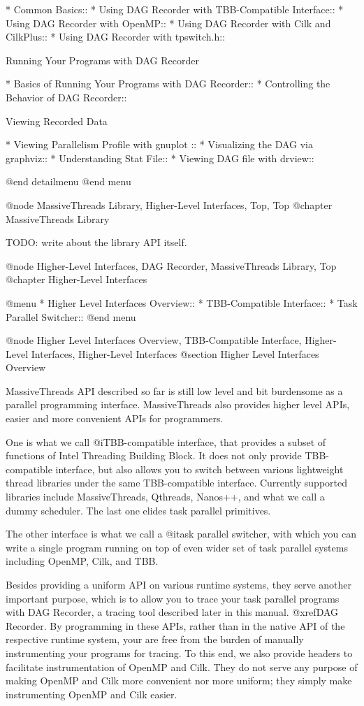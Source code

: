 * Common Basics::
* Using DAG Recorder with TBB-Compatible Interface::
* Using DAG Recorder with OpenMP::
* Using DAG Recorder with Cilk and CilkPlus::
* Using DAG Recorder with tpswitch.h::

Running Your Programs with DAG Recorder

* Basics of Running Your Programs with DAG Recorder::
* Controlling the Behavior of DAG Recorder::

Viewing Recorded Data

* Viewing Parallelism Profile with gnuplot ::
* Visualizing the DAG via graphviz::
* Understanding Stat File::
* Viewing DAG file with drview::

@end detailmenu
@end menu

@node MassiveThreads Library, Higher-Level Interfaces, Top, Top
@chapter MassiveThreads Library

TODO: write about the library API itself.

@node Higher-Level Interfaces, DAG Recorder, MassiveThreads Library, Top
@chapter Higher-Level Interfaces

@menu
* Higher Level Interfaces Overview::
* TBB-Compatible Interface::
* Task Parallel Switcher::
@end menu

@node Higher Level Interfaces Overview, TBB-Compatible Interface, Higher-Level Interfaces, Higher-Level Interfaces
@section Higher Level Interfaces Overview

MassiveThreads API described so far is still low level and bit
burdensome as a parallel programming interface.  MassiveThreads also
provides higher level APIs, easier and more convenient APIs for
programmers.

One is what we call @i{TBB-compatible interface}, that provides a subset
of functions of Intel Threading Building Block.  It does not only
provide TBB-compatible interface, but also allows you to switch between
various lightweight thread libraries under the same TBB-compatible
interface.  Currently supported libraries include MassiveThreads,
Qthreads, Nanos++, and what we call a dummy scheduler.  The last one
elides task parallel primitives.

The other interface is what we call a @i{task parallel switcher}, with
which you can write a single program running on top of even wider set of
task parallel systems including OpenMP, Cilk, and TBB.

Besides providing a uniform API on various runtime systems, they serve
another important purpose, which is to allow you to trace your task
parallel programs with DAG Recorder, a tracing tool described later in
this manual. @xref{DAG Recorder}. By programming in these APIs, rather
than in the native API of the respective runtime system, your are free
from the burden of manually instrumenting your programs for tracing.  To
this end, we also provide headers to facilitate instrumentation of
OpenMP and Cilk.  They do not serve any purpose of making OpenMP and
Cilk more convenient nor more uniform; they simply make instrumenting
OpenMP and Cilk easier.

